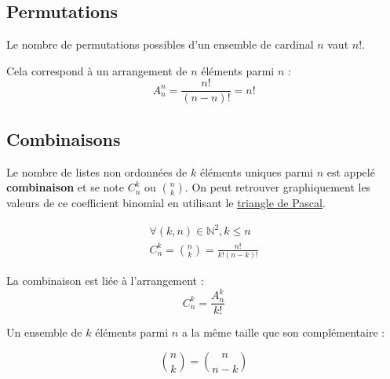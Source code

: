 \subsection{Permutations}

Le nombre de permutations possibles d'un ensemble de cardinal $n$ vaut $n!$.

\begin{remarque}
    Cela correspond à un arrangement de $n$ éléments parmi $n$ :
    \begin{equation*}
        A^n_n = \frac{n!}{(n-n)!} = n!
    \end{equation*}
\end{remarque}

\subsection{Combinaisons}

Le nombre de listes non ordonnées de $k$ éléments uniques parmi $n$ est appelé \textbf{combinaison} et se note $C^k_n$ ou $\binom{n}{k}$. On peut retrouver graphiquement les valeurs de ce coefficient binomial en utilisant le \href{https://en.wikipedia.org/wiki/Pascal%27s_triangle}{triangle de Pascal}.

\begin{definition}
    \begin{equation*}
        \begin{split}
            \forall (k,n) \in \mathbb{N}^2, k \le n \\
            C^k_n = \binom{n}{k} = \frac{n!}{k!(n-k)!}
        \end{split}
    \end{equation*}
\end{definition}

\begin{remarque}
    La combinaison est liée à l'arrangement :
    \begin{equation*}
        C^k_n = \frac{A^k_n}{k!}
    \end{equation*}
\end{remarque}

\begin{remarque}
    Un ensemble de $k$ éléments parmi $n$ a la même taille que son complémentaire :

    \begin{equation*}
        \binom{n}{k} = \binom{n}{n-k}
    \end{equation*}
\end{remarque}

